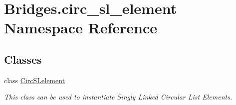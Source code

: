 \hypertarget{namespace_bridges_1_1circ__sl__element}{}\section{Bridges.\+circ\+\_\+sl\+\_\+element Namespace Reference}
\label{namespace_bridges_1_1circ__sl__element}
\subsection*{Classes}
\begin{DoxyCompactItemize}
\item 
class \mbox{\hyperlink{class_bridges_1_1circ__sl__element_1_1_circ_s_lelement}{Circ\+S\+Lelement}}
\begin{DoxyCompactList}\small\item\em This class can be used to instantiate Singly Linked Circular List Elements. \end{DoxyCompactList}\end{DoxyCompactItemize}
